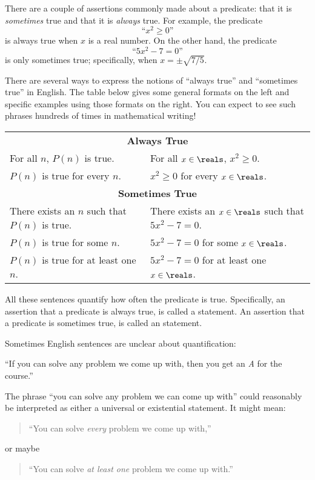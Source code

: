 There are a couple of assertions commonly made about a predicate: that it
is \emph{sometimes} true and that it is \emph{always} true.  For
example, the predicate
%
\[
\text{``$x^2 \geq 0$''}
\]
%
is always true when $x$ is a real number.  On the other hand, the
predicate
%
\[
\text{``$5x^2 - 7 = 0$''}
\]
%
is only sometimes true; specifically, when $x = \pm \sqrt{7/5}$.

There are several ways to express the notions of ``always true'' and
``sometimes true'' in English.  The table below gives some general
formats on the left and specific examples using those formats on the
right.  You can expect to see such phrases hundreds of times in
mathematical writing!
%
\begin{center}
\begin{tabular}{ll}
\multicolumn{2}{c}{\textbf{Always True}} \\[1ex]
For all $n$, $P(n)$ is true. & For all $x \in \reals$, $x^2 \geq 0$. \\
$P(n)$ is true for every $n$. & $x^2 \geq 0$ for every $x \in \reals$. \\[2ex]
\multicolumn{2}{c}{\textbf{Sometimes True}} \\[1ex]
There exists an $n$ such that $P(n)$ is true. & There exists an $x \in \reals$ such that $5x^2 - 7 = 0$.\\
$P(n)$ is true for some $n$. & $5x^2 - 7 = 0$ for some $x \in \reals$.\\
$P(n)$ is true for at least one $n$. & $5x^2-7=0$ for at least one $x \in \reals$.
\end{tabular}
\end{center}

All these sentences quantify how often the predicate is true.
Specifically, an assertion that a predicate is always true, is called
a  statement.  An assertion that a
predicate is sometimes true, is called an  statement.

Sometimes English sentences are unclear about quantification:
%
\begin{center}
  ``If you can solve any problem we come up with, then you get an \emph{A}
  for the course.''
\end{center}
%
The phrase ``you can solve any problem we can come up with'' could
reasonably be interpreted as either a universal or existential
statement.  It might mean:
%
\begin{quote}
``You can solve \emph{every} problem we come up with,''
\end{quote}
or maybe
\begin{quote}
``You can solve \emph{at least one} problem we come up with.''
\end{quote}

